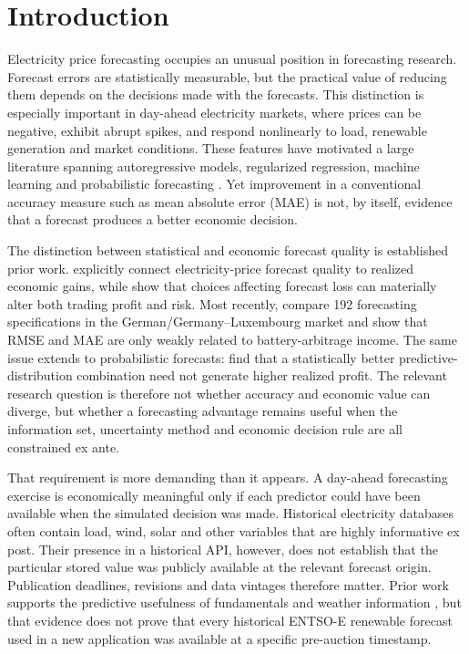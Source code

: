 \section{Introduction}
\label{sec:introduction}

Electricity price forecasting occupies an unusual position in forecasting research. Forecast errors are statistically measurable, but the practical value of reducing them depends on the decisions made with the forecasts. This distinction is especially important in day-ahead electricity markets, where prices can be negative, exhibit abrupt spikes, and respond nonlinearly to load, renewable generation and market conditions. These features have motivated a large literature spanning autoregressive models, regularized regression, machine learning and probabilistic forecasting \citep{weron2014,zielweron2018,lago2021}. Yet improvement in a conventional accuracy measure such as mean absolute error (MAE) is not, by itself, evidence that a forecast produces a better economic decision.

The distinction between statistical and economic forecast quality is established prior work. \citet{kathziel2018} explicitly connect electricity-price forecast quality to realized economic gains, while \citet{serafin2025} show that choices affecting forecast loss can materially alter both trading profit and risk. Most recently, \citet{maciejowska2026} compare 192 forecasting specifications in the German/Germany--Luxembourg market and show that RMSE and MAE are only weakly related to battery-arbitrage income. The same issue extends to probabilistic forecasts: \citet{nitka2023} find that a statistically better predictive-distribution combination need not generate higher realized profit. The relevant research question is therefore not whether accuracy and economic value can diverge, but whether a forecasting advantage remains useful when the information set, uncertainty method and economic decision rule are all constrained ex ante.

That requirement is more demanding than it appears. A day-ahead forecasting exercise is economically meaningful only if each predictor could have been available when the simulated decision was made. Historical electricity databases often contain load, wind, solar and other variables that are highly informative ex post. Their presence in a historical API, however, does not establish that the particular stored value was publicly available at the relevant forecast origin. Publication deadlines, revisions and data vintages therefore matter. Prior work supports the predictive usefulness of fundamentals and weather information \citep{kathziel2018,sgarlato2023}, but that evidence does not prove that every historical ENTSO-E renewable forecast used in a new application was available at a specific pre-auction timestamp.

